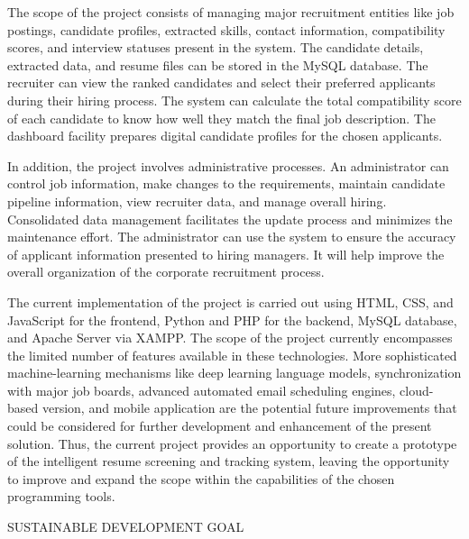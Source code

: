 \documentclass[12pt,a4paper]{report}
\begin{document}
The scope of the project consists of managing major recruitment entities like job postings, candidate profiles, extracted skills, contact information, compatibility scores, and interview statuses present in the system. The candidate details, extracted data, and resume files can be stored in the MySQL database. The recruiter can view the ranked candidates and select their preferred applicants during their hiring process. The system can calculate the total compatibility score of each candidate to know how well they match the final job description. The dashboard facility prepares digital candidate profiles for the chosen applicants.

In addition, the project involves administrative processes. An administrator can control job information, make changes to the requirements, maintain candidate pipeline information, view recruiter data, and manage overall hiring. Consolidated data management facilitates the update process and minimizes the maintenance effort. The administrator can use the system to ensure the accuracy of applicant information presented to hiring managers. It will help improve the overall organization of the corporate recruitment process.

The current implementation of the project is carried out using HTML, CSS, and JavaScript for the frontend, Python and PHP for the backend, MySQL database, and Apache Server via XAMPP. The scope of the project currently encompasses the limited number of features available in these technologies. More sophisticated machine-learning mechanisms like deep learning language models, synchronization with major job boards, advanced automated email scheduling engines, cloud-based version, and mobile application are the potential future improvements that could be considered for further development and enhancement of the present solution. Thus, the current project provides an opportunity to create a prototype of the intelligent resume screening and tracking system, leaving the opportunity to improve and expand the scope within the capabilities of the chosen programming tools.
 
\clearpage



{\protect\numberline{\thechapter}SUSTAINABLE DEVELOPMENT GOAL}

\thispagestyle{empty}

\vspace*{\fill}
\end{document}

